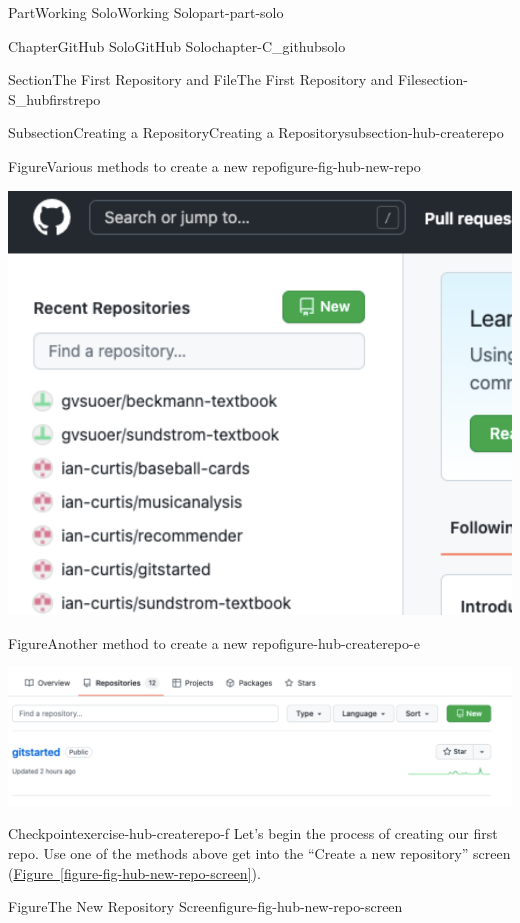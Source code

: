\documentclass[oneside,10pt,]{book}
\newcommand{\xreffont}{\relax}
\begin{document}
\begin{partptx}{Part}{Working Solo}{}{Working Solo}{}{}{part-part-solo}
\begin{chapterptx}{Chapter}{GitHub Solo}{}{GitHub Solo}{}{}{chapter-C_githubsolo}
\begin{sectionptx}{Section}{The First Repository and File}{}{The First Repository and File}{}{}{section-S_hubfirstrepo}
\begin{subsectionptx}{Subsection}{Creating a Repository}{}{Creating a Repository}{}{}{subsection-hub-createrepo}
\begin{figureptx}{Figure}{Various methods to create a new repo}{figure-fig-hub-new-repo}{}
\begin{sidebyside}{2}{0.025}{0.025}{0.05}
\begin{sbspanel}{0.45}
\includegraphics[width=\linewidth]{external/hub_new_repo_home.pdf}
\end{sbspanel}%
\end{sidebyside}%
\tcblower
\end{figureptx}%
\begin{figureptx}{Figure}{Another method to create a new repo}{figure-hub-createrepo-e}{}%
\begin{image}{0.05}{0.9}{0.05}{}%
\includegraphics[width=\linewidth]{external/hub_new_repo_yourrepos.pdf}
\end{image}%
\tcblower
\end{figureptx}%
\begin{inlineexercise}{Checkpoint}{}{exercise-hub-createrepo-f}%
Let's begin the process of creating our first repo. Use one of the methods above get into the ``Create a new repository'' screen (\hyperref[figure-fig-hub-new-repo-screen]{Figure~{\xreffont\ref{figure-fig-hub-new-repo-screen}}}).%
\end{inlineexercise}%
\begin{figureptx}{Figure}{The New Repository Screen}{figure-fig-hub-new-repo-screen}{}%
\begin{image}{0.05}{0.9}{0.05}{}%

\end{image}
\end{figureptx}
\end{subsectionptx}
\end{sectionptx}
\end{chapterptx}
\end{partptx}
\end{document}
